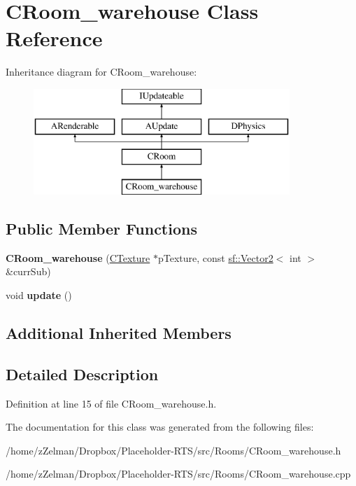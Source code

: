 \hypertarget{classCRoom__warehouse}{\section{C\-Room\-\_\-warehouse Class Reference}
\label{classCRoom__warehouse}
}
Inheritance diagram for C\-Room\-\_\-warehouse\-:\begin{figure}[H]
\begin{center}
\leavevmode
\includegraphics[height=4.000000cm]{classCRoom__warehouse}
\end{center}
\end{figure}
\subsection*{Public Member Functions}
\begin{DoxyCompactItemize}
\item 
\hypertarget{classCRoom__warehouse_a181b6becc788b6cec95e8f73116e7a30}{{\bfseries C\-Room\-\_\-warehouse} (\hyperlink{classCTexture}{C\-Texture} $\ast$p\-Texture, const \hyperlink{classsf_1_1Vector2}{sf\-::\-Vector2}$<$ int $>$ \&curr\-Sub)}\label{classCRoom__warehouse_a181b6becc788b6cec95e8f73116e7a30}

\item 
\hypertarget{classCRoom__warehouse_ab4f3d3a87421ef23febd6f259341d4cd}{void {\bfseries update} ()}\label{classCRoom__warehouse_ab4f3d3a87421ef23febd6f259341d4cd}

\end{DoxyCompactItemize}
\subsection*{Additional Inherited Members}


\subsection{Detailed Description}


Definition at line 15 of file C\-Room\-\_\-warehouse.\-h.



The documentation for this class was generated from the following files\-:\begin{DoxyCompactItemize}
\item 
/home/z\-Zelman/\-Dropbox/\-Placeholder-\/\-R\-T\-S/src/\-Rooms/C\-Room\-\_\-warehouse.\-h\item 
/home/z\-Zelman/\-Dropbox/\-Placeholder-\/\-R\-T\-S/src/\-Rooms/C\-Room\-\_\-warehouse.\-cpp\end{DoxyCompactItemize}
